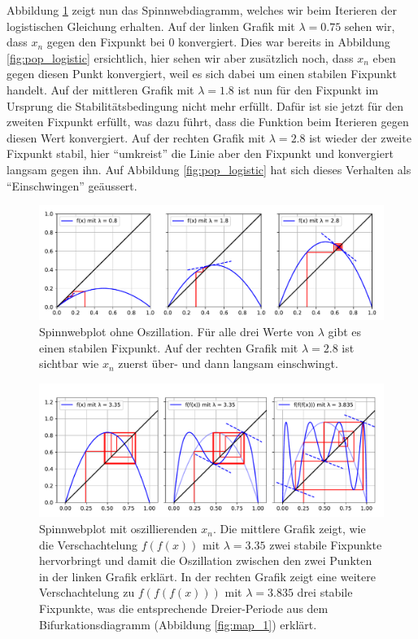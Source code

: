 Abbildung \ref{fig:web_1} zeigt nun das Spinnwebdiagramm,
welches wir beim Iterieren der logistischen Gleichung erhalten.  
Auf der linken Grafik mit $\lambda = 0.75$ sehen wir,
dass $x_n$ gegen den Fixpunkt bei $0$ konvergiert. 
Dies war bereits in Abbildung \ref{fig:pop_logistic} ersichtlich,
hier sehen wir aber zusätzlich noch, dass $x_n$ eben gegen
diesen Punkt konvergiert, weil es sich dabei um einen
stabilen Fixpunkt handelt.  
Auf der mittleren Grafik mit $\lambda = 1.8$ ist nun für den
Fixpunkt im Ursprung die Stabilitätsbedingung nicht
mehr erfüllt. 
Dafür ist sie jetzt für den zweiten Fixpunkt erfüllt, 
was dazu führt, dass die Funktion beim Iterieren gegen 
diesen Wert konvergiert.  
Auf der rechten Grafik mit $\lambda = 2.8$ ist wieder der  
zweite Fixpunkt stabil, hier ``umkreist'' die Linie aber
den Fixpunkt und konvergiert langsam gegen ihn. 
Auf Abbildung \ref{fig:pop_logistic} hat sich dieses Verhalten
als ``Einschwingen'' geäussert.
%
\begin{figure}[h!]
    \includegraphics[width=\linewidth]{papers/logistic/figures/web_1.pdf}
    \caption{
        Spinnwebplot ohne Oszillation.
        Für alle drei Werte von $\lambda$ gibt es 
        einen stabilen Fixpunkt. 
        Auf der rechten Grafik mit $\lambda = 2.8$
        ist sichtbar wie $x_n$ 
        zuerst über- und dann langsam einschwingt.
    }
    \label{fig:web_1}
\end{figure}
\begin{figure}[h!]
    \includegraphics[width=\linewidth]{papers/logistic/figures/web_2.pdf}
    \caption{
        Spinnwebplot mit oszillierenden $x_n$. 
        Die mittlere Grafik zeigt, wie 
        die Verschachtelung $f(f(x))$ mit 
        $\lambda = 3.35$ zwei
        stabile Fixpunkte hervorbringt und 
        damit die Oszillation zwischen
        den zwei Punkten in der linken Grafik erklärt.
        In der rechten Grafik zeigt eine weitere 
        Verschachtelung zu $f(f(f(x)))$
        mit $\lambda = 3.835$ 
        drei stabile Fixpunkte, was
        die entsprechende Dreier-Periode aus dem 
        Bifurkationsdiagramm (Abbildung \ref{fig:map_1})
        erklärt. 
    }
    \label{fig:web_2}
\end{figure}

